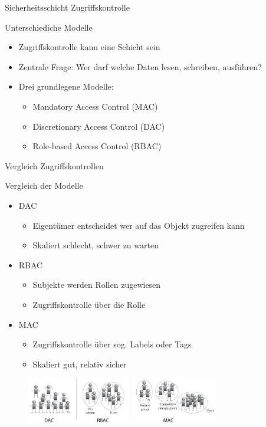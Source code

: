 \begin{frame}{Sicherheitsschicht Zugriffskontrolle}
  \begin{block}{Unterschiediche Modelle}
    \begin{itemize}[<+->]
      \item Zugriffskontrolle kann eine Schicht sein
      \item Zentrale Frage: Wer darf welche Daten lesen, schreiben, ausführen?
      \item Drei grundlegene Modelle:
      \begin{itemize}[<+->]
        \item Mandatory Access Control (MAC)
        \item Discretionary Access Control (DAC)
        \item Role-based Access Control (RBAC)
      \end{itemize}
    \end{itemize}
  \end{block}
\end{frame}

\begin{frame}{Vergleich Zugriffskontrollen}
  \begin{block}{Vergleich der Modelle}
    \begin{itemize}[<+->]
      \item DAC
      \begin{itemize}[<+->]
        \item Eigentümer entscheidet wer auf das Objekt zugreifen kann
        \item Skaliert schlecht, schwer zu warten
      \end{itemize}
      \item RBAC
      \begin{itemize}[<+->]
        \item Subjekte werden Rollen zugewiesen
        \item Zugriffskontrolle über die Rolle
      \end{itemize}
      \item MAC
      \begin{itemize}[<+->]
        \item Zugriffskontrolle über sog. Labels oder Tags
        \item Skaliert gut, relativ sicher
      \end{itemize}
    \end{itemize}
  \end{block}
  \begin{figure}
    \centering
    \includegraphics[width=0.75\textwidth]{assets/access_control2}
  \end{figure}
\end{frame}

